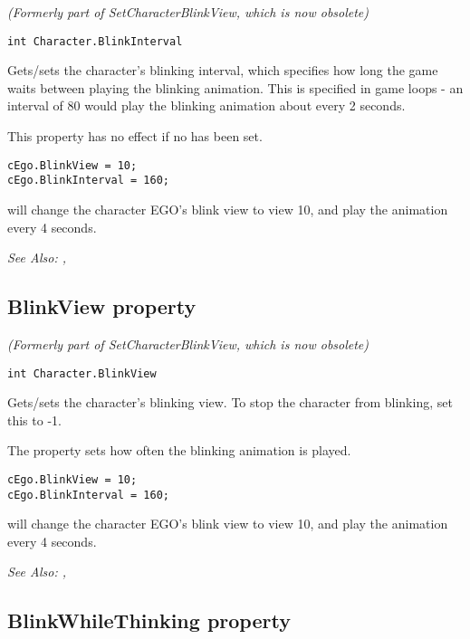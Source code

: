 \it{(Formerly part of SetCharacterBlinkView, which is now obsolete)}

\begin{verbatim}
int Character.BlinkInterval
\end{verbatim}
Gets/sets the character's blinking interval, which specifies how long the game waits
between playing the blinking animation. This is specified in game loops - an interval
of 80 would play the blinking animation about every 2 seconds.

This property has no effect if no  has been set.

\begin{verbatim}
cEgo.BlinkView = 10;
cEgo.BlinkInterval = 160;
\end{verbatim}
will change the character EGO's blink view to view 10, and play the animation every 4 seconds.

\it{See Also:} ,



\subsection{BlinkView property}\label{Character.BlinkView}%

\it{(Formerly part of SetCharacterBlinkView, which is now obsolete)}

\begin{verbatim}
int Character.BlinkView
\end{verbatim}
Gets/sets the character's blinking view. To stop the character from blinking, set
this to -1.

The  property sets how often the blinking
animation is played.

\begin{verbatim}
cEgo.BlinkView = 10;
cEgo.BlinkInterval = 160;
\end{verbatim}
will change the character EGO's blink view to view 10, and play the animation every 4 seconds.

\it{See Also:} ,


\subsection{BlinkWhileThinking property}\label{Character.BlinkWhileThinking}%

